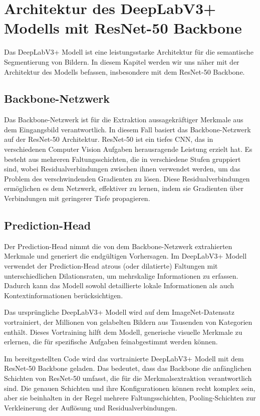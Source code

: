 

\chapter{Architektur des DeepLabV3+ Modells mit ResNet-50 Backbone}

Das DeepLabV3+ Modell ist eine leistungsstarke Architektur für die semantische Segmentierung von Bildern. In diesem Kapitel werden wir uns näher mit der Architektur des Modells befassen, insbesondere mit dem ResNet-50 Backbone.

\section{Backbone-Netzwerk}
    Das Backbone-Netzwerk ist für die Extraktion aussagekräftiger Merkmale aus dem Eingangsbild verantwortlich. In diesem Fall basiert das Backbone-Netzwerk auf der ResNet-50 Architektur. ResNet-50 ist ein tiefes CNN, das in verschiedenen Computer Vision Aufgaben herausragende Leistung erzielt hat. Es besteht aus mehreren Faltungs­schichten, die in verschiedene Stufen gruppiert sind, wobei Residualverbindungen zwischen ihnen verwendet werden, um das Problem des verschwindenden Gradienten zu lösen. Diese Residualverbindungen ermöglichen es dem Netzwerk, effektiver zu lernen, indem sie Gradienten über Verbindungen mit geringerer Tiefe propagieren.

\section{Prediction-Head}
    Der Prediction-Head nimmt die von dem Backbone-Netzwerk extrahierten Merkmale und generiert die endgültigen Vorhersagen. Im DeepLabV3+ Modell verwendet der Prediction-Head atrous (oder dilatierte) Faltungen mit unterschiedlichen Dilationsraten, um mehrskalige Informationen zu erfassen. Dadurch kann das Modell sowohl detaillierte lokale Informationen als auch Kontextinformationen berücksichtigen.
    
    Das ursprüngliche DeepLabV3+ Modell wird auf dem ImageNet-Datensatz vortrainiert, der Millionen von gelabelten Bildern aus Tausenden von Kategorien enthält. Dieses Vortraining hilft dem Modell, generische visuelle Merkmale zu erlernen, die für spezifische Aufgaben feinabgestimmt werden können.
    
    Im bereitgestellten Code wird das vortrainierte DeepLabV3+ Modell mit dem ResNet-50 Backbone geladen. Das bedeutet, dass das Backbone die anfänglichen Schichten von ResNet-50 umfasst, die für die Merkmalsextraktion verantwortlich sind. Die genauen Schichten und ihre Konfigurationen können recht komplex sein, aber sie beinhalten in der Regel mehrere Faltungsschichten, Pooling-Schichten zur Verkleinerung der Auflösung und Residualverbindungen.
    
